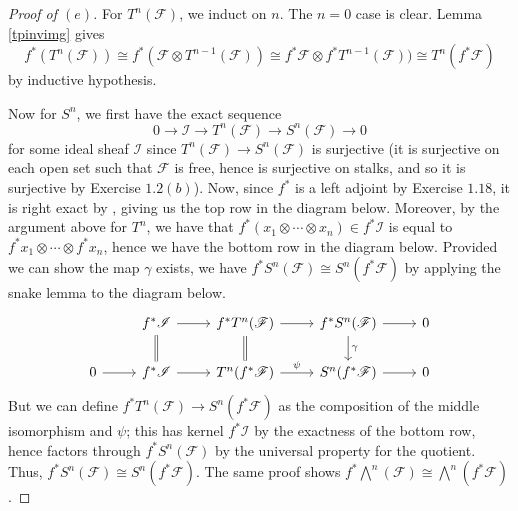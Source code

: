 \documentclass[10pt]{article}
\theoremstyle{definition}
\theoremstyle{remark}
\numberwithin{equation}{section}
\numberwithin{figure}{subsubsection}
\newcommand{\FF}{\mathscr{F}}
\newcommand{\II}{\mathscr{I}}
\begin{document}
\begin{proof}[Proof of $(e)$]
  For $T^n(\FF)$, we induct on $n$. The $n=0$ case is clear. Lemma \ref{tpinvimg} gives
  \begin{equation*}
    f^*(T^n(\FF)) \cong f^*(\FF \otimes T^{n-1}(\FF)) \cong f^*\FF \otimes f^*T^{n-1}(\FF)) \cong T^n(f^*\FF)
  \end{equation*}
  by inductive hypothesis.
  \par Now for $S^n$, we first have the exact sequence
  \begin{equation*}
    0 \longrightarrow \II \longrightarrow T^n(\FF) \longrightarrow S^n(\FF) \longrightarrow 0
  \end{equation*}
  for some ideal sheaf $\II$ since $T^n(\FF) \to S^n(\FF)$ is surjective (it is
  surjective on each open set such that $\FF$ is free, hence is surjective on
  stalks, and so it is surjective by Exercise $1.2(b)$). Now, since $f^*$ is a
  left adjoint by Exercise $1.18$, it is right exact by \cite[Thm.~2.6.1]{Wei94}, giving us the top row in the diagram below. Moreover, by the argument above for $T^n$, we have that $f^*(x_1 \otimes \cdots \otimes x_n) \in f^*\II$ is equal to $f^*x_1 \otimes \cdots \otimes f^*x_n$, hence we have the bottom row in the diagram below. Provided we can show the map $\gamma$ exists, we have $f^*S^n(\FF) \cong S^n(f^*\FF)$ by applying the snake lemma \cite[Lem.~1.3.2]{Wei94} to the diagram below.
  \begin{equation*}
    \begin{tikzcd}
      {}& f^*\II \rar\dar[equals] & f^*T^n(\FF) \rar\dar[equals] & f^*S^n(\FF) \rar\dar{\gamma} & 0\\
      0 \rar & f^*\II \rar & T^n(f^*\FF) \rar{\psi} & S^n(f^*\FF) \rar & 0
    \end{tikzcd}
  \end{equation*}
  But we can define $f^*T^n(\FF) \to S^n(f^*\FF)$ as the composition of the middle isomorphism and $\psi$; this has kernel $f^*\II$ by the exactness of the bottom row, hence factors through $f^*S^n(\FF)$ by the universal property for the quotient. Thus, $f^*S^n(\FF) \cong S^n(f^*\FF)$. The same proof shows $f^*\bigwedge^n(\FF) \cong \bigwedge^n(f^*\FF)$.
\end{proof}
\end{document}
